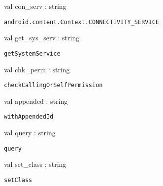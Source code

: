 \documentclass[11pt]{article}
\begin{document}
\begin{ocamldocsigend}
\begin{ocamldocdescription}
\end{ocamldocdescription}


\label{val:Android.Content.con-underscoreserv}\begin{ocamldoccode}
val con_serv : string
\end{ocamldoccode}
\begin{ocamldocdescription}
{\tt{android.content.Context.CONNECTIVITY\_SERVICE}}


\end{ocamldocdescription}


\label{val:Android.Content.get-underscoresys-underscoreserv}\begin{ocamldoccode}
val get_sys_serv : string
\end{ocamldoccode}
\begin{ocamldocdescription}
{\tt{getSystemService}}


\end{ocamldocdescription}


\label{val:Android.Content.chk-underscoreperm}\begin{ocamldoccode}
val chk_perm : string
\end{ocamldoccode}
\begin{ocamldocdescription}
{\tt{checkCallingOrSelfPermission}}


\end{ocamldocdescription}


\label{val:Android.Content.appended}\begin{ocamldoccode}
val appended : string
\end{ocamldoccode}
\begin{ocamldocdescription}
{\tt{withAppendedId}}


\end{ocamldocdescription}


\label{val:Android.Content.query}\begin{ocamldoccode}
val query : string
\end{ocamldoccode}
\begin{ocamldocdescription}
{\tt{query}}


\end{ocamldocdescription}


\label{val:Android.Content.set-underscoreclass}\begin{ocamldoccode}
val set_class : string
\end{ocamldoccode}
\begin{ocamldocdescription}
{\tt{setClass}}



\end{ocamldocdescription}
\end{ocamldocsigend}
\end{document}
